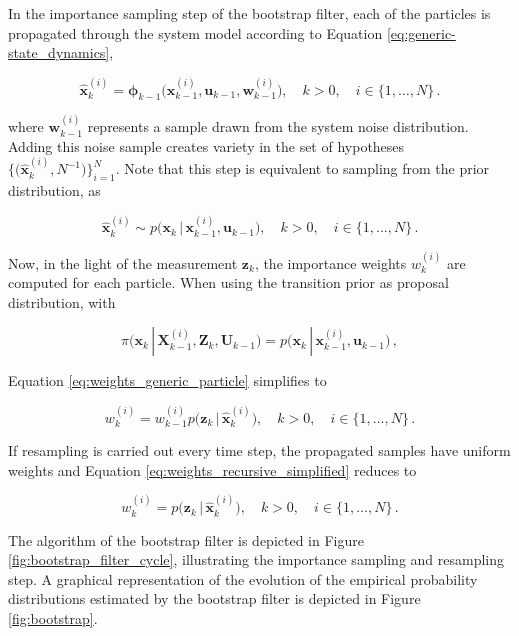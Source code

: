 In the importance sampling step of the bootstrap filter, each of the particles is propagated through the system model according to Equation \ref{eq:generic-state_dynamics}, 

\begin{equation}\label{eq:propagate_particles}
  \hat{\bm{x}}^{(i)}_k = \bm{\phi}_{k-1}\big(\bm{x}^{(i)}_{k-1}, \bm{u}_{k-1}, \bm{w}^{(i)}_{k-1}\big), \quad k > 0,  \quad i \in \{1, \dots, N\}\,.
\end{equation}

\noindent
where $\bm{w}^{(i)}_{k-1}$ represents a sample drawn from the system noise distribution. Adding this noise sample creates variety in the set of hypotheses $\Big\{\big(\hat{\bm{x}}^{(i)}_{k}, N^{-1}\big)\Big\}_{i=1}^N$. Note that this step is equivalent to sampling from the prior distribution, as

\begin{equation}
  \hat{\bm{x}}^{(i)}_k \sim p\big(\bm{x}_k\,|\,\bm{x}^{(i)}_{k-1}, \bm{u}_{k-1}\big), \quad k > 0,  \quad i \in \{1, \dots, N\}\,.
\end{equation}


Now, in the light of the measurement $\bm{z}_k$, the importance weights $w^{(i)}_k$ are computed for each particle. When using the transition prior as proposal distribution, with

\begin{equation}
  \pi\big(\bm{x}_k\,|\,\bm{X}^{(i)}_{k-1}, \bm{Z}_{k}, \bm{U}_{k-1}\big) = p\big(\bm{x}_k\,|\,\bm{x}^{(i)}_{k-1}, \bm{u}_{k-1}\big)\,,
\end{equation}

\noindent
Equation \ref{eq:weights_generic_particle} simplifies to

\begin{equation}\label{eq:recursive_weights_transition_prior}
  w^{(i)}_k = w^{(i)}_{k-1} p\big(\bm{z}_k\,|\,\hat{\bm{x}}^{(i)}_k\big), \quad k > 0,  \quad i \in \{1, \dots, N\}\,.
\end{equation}


\noindent
If resampling is carried out every time step, the propagated samples have uniform weights and Equation \ref{eq:weights_recursive_simplified} reduces to 

\begin{equation}
  w^{(i)}_k = p\big(\bm{z}_k\,|\,\hat{\bm{x}}^{(i)}_k\big), \quad k > 0,  \quad i \in \{1, \dots, N\}\,.
\end{equation}


\noindent
The algorithm of the bootstrap filter is depicted in Figure \ref{fig:bootstrap_filter_cycle}, illustrating the importance sampling and resampling step. A graphical representation of the evolution of the empirical probability distributions estimated by the bootstrap filter is depicted in Figure \ref{fig:bootstrap}.

